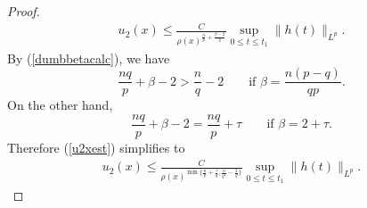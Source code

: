 \documentclass[12pt]{amsart}
\renewcommand{\1}{{\mathbf 1}}
\theoremstyle{others}
\numberwithin{equation}{section}
\begin{document}
\begin{proof}
\begin{equation}
     \begin{split}
         u_2(x) \leq \frac{C}{\rho(x)^{\frac{n}{p} + \frac{\beta - 2}{q}} } \sup_{0 \leq t \leq t_1} \|h(t) \|_{L^p}.
         \end{split}
     \end{equation}
     By (\ref{dumbbetacalc}), we have
     $$\frac{nq}{p} + \beta - 2 > \frac{n}{q} - 2 \qquad \text{if } \beta = \frac{n (p-q)}{qp}.$$
     On the other hand,
     $$\frac{nq}{p} + \beta - 2 = \frac{nq}{p} + \tau \qquad \text{if } \beta = 2+\tau.$$
     Therefore (\ref{u2xest}) simplifies to 
\begin{equation}\label{u2xcase1est}
     \begin{split}
         u_2(x) \leq \frac{C}{\rho(x)^{\min\{ \frac{n}{p} + \frac{\tau}{q}, \frac{n}{q^2} - \frac{2}{q} \} } } \sup_{0 \leq t \leq t_1} \|h(t) \|_{L^p}.
         \end{split}
     \end{equation}
     

\end{proof}
\end{document}
